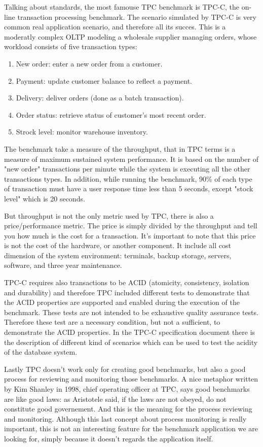 Talking about standards, the most famouse TPC benchmark is TPC-C, the on-line transaction processing benchmark. The scenario simulated by TPC-C is very common real application scenario, and therefore all its succes. This is a moderatly complex OLTP modeling a wholesale supplier managing orders, whose workload consists of five transaction types:
\begin{enumerate}
	\item New order: enter a new order  from a customer.
	\item Payment: update customer balance to reflect a payment.
	\item Delivery: deliver orders (done as a batch transaction).
	\item Order status: retrieve status of customer's most recent order.
	\item Strock level: monitor warehouse inventory.
\end{enumerate}
The benchmark take a measure of the throughput, that in TPC terms is a measure of maximum sustained system performance. It is based on the number of "new order" transactions per minute while the system is executing all the other transactions types. In addition, while running the benchmark, 90\% of each type of transaction must have a user response time less than 5 seconds, except "stock level" which is 20 seconds.

But throughput is not the only metric used by TPC, there is also a price/performance metric. The price is simply divided by the throughput and tell you how much is the cost for a transaction. It's important to note that this price is not the cost of the hardware, or another component. It include all cost dimension of the system environment: terminals, backup storage, servers, software, and three year maintenance.

TPC-C requires also transactions to be ACID (atomicity, consistency, isolation and durability) and therefore TPC included different tests to demonstrate that the ACID properties are supported and enabled during the execution of the benchmark. These tests are not intended to be exhaustive quality assurance tests. Therefore these test are a necessary condition, but not a sufficient, to demonstrate the ACID properties. In the TPC-C specification document \cite{TPC-C} there is the description of different kind of scenarios which can be used to test the acidity of the database system.

Lastly TPC doesn't work only for creating good benchmarks, but also a good process for reviewing and monitoring those benchmarks. A nice metaphor written by Kim Shanley in 1998, chief operating officer at TPC, says good benchmarks are like good laws: as Aristotele said, if the laws are not obeyed, do not constitute good governement. And this is the meaning for the process reviewing and monitoring. Although this last concept about process monitoring is really important, this is not an interesting feature for the benchmark application we are looking for, simply because it doesn't regards the application itself.

